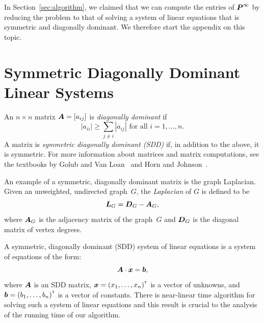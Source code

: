 In Section~\ref{sec:algorithm}, we claimed that we can compute the entries of 
$\boldsymbol{P}^{\infty}$ by reducing the problem to that of solving a system of linear 
equations that is symmetric and diagonally dominant. We therefore start the 
appendix on this topic.

\section{Symmetric Diagonally Dominant Linear Systems}\label{sec:diagonally_dominant}

An $n \times n$ matrix $\boldsymbol{A} = [a_{ij}]$ is \emph{diagonally dominant} if 
\[
	|a_{ii}| \geq \sum_{j \neq i} {|a_{ij}|} \mbox{ for all } i = 1, \ldots, n.
\] 
A matrix is \emph{symmetric diagonally dominant (SDD)} if, in addition to the above, 
it is symmetric. For more information about matrices and matrix computations, 
see the textbooks by Golub and Van Loan~\cite{GvL13} and Horn and Johnson~\cite{HJ13}. 

An example of a symmetric, diagonally dominant matrix is the graph Laplacian. 
Given an unweighted, undirected graph~$G$, the \emph{Laplacian} of $G$ 
is defined to be 
\[
\boldsymbol{L}_G = \boldsymbol{D}_G - \boldsymbol{A}_G,
\] 
where $\boldsymbol{A}_G$ is the adjacency matrix of the graph~$G$ and $\boldsymbol{D}_G$ 
is the diagonal matrix of vertex degrees. 

A symmetric, diagonally dominant (SDD) system of linear equations is a system of 
equations of the form:
\[
	\boldsymbol{A} \cdot \boldsymbol{x} = \boldsymbol{b},
\]
where $\boldsymbol{A}$ is an SDD matrix, $\boldsymbol{x} = {(x_1, \ldots, x_n)}^{\scriptscriptstyle \mathsf{T}}$ 
is a vector of unknowns, and $\boldsymbol{b} = {(b_1, \ldots, b_n)}^{\scriptscriptstyle \mathsf{T}}$ is a vector of constants. 
There is near-linear time algorithm for solving such a system of linear equations 
and this result is crucial to the analysis of the running time of our algorithm. 

